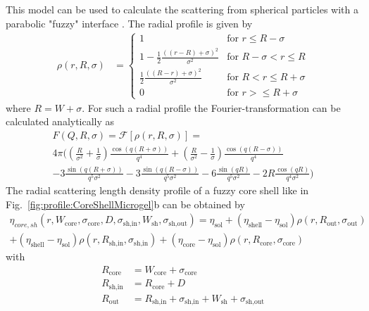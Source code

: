 This model can be used to calculate the scattering from spherical
particles with a parabolic "fuzzy" interface \cite{Berndt2005,Berndt2006,Berndt2006a}.
The radial profile is given by
\begin{align}
\rho(r,R,\sigma) &=
\begin{cases}
1 & \mbox{for } r\leq R-\sigma \\
1-\frac{1}{2}\frac{\left((r-R)+\sigma\right)^2}{\sigma^2} & \mbox{for } R-\sigma < r \leq R \\
\frac{1}{2}\frac{\left((R-r)+\sigma\right)^2}{\sigma^2} & \mbox{for } R< r\leq R+\sigma \\
0 & \mbox{for } r > \leq R+\sigma
\end{cases}
\label{eq:CoreShellMicrogelProfile}
\end{align}
where $R=W+\sigma$. For such a radial profile the Fourier-transformation can be calculated analytically as
\begin{multline}
F(Q,R,\sigma) = \mathcal{F}[\rho(r,R,\sigma)] = \\
4 \pi \Bigg(
        \left(\frac{R}{\sigma^2}+\frac{1}{\sigma}\right) \frac{\cos (q(R+\sigma))}{q^4}
    +   \left(\frac{R}{\sigma^2}-\frac{1}{\sigma}\right) \frac{\cos (q(R-\sigma))}{q^4} \\
    -   3 \frac{\sin(q(R+\sigma))}{q^5 \sigma^2}
    -   3 \frac{\sin(q(R-\sigma))}{q^5 \sigma^2}
    -   6  \frac{\sin(qR)}{q^5 \sigma^2}
    -   2 R \frac{\cos(qR)}{q^4 \sigma^2}
\Bigg)
\end{multline}
The radial scattering length density profile of a fuzzy core
shell like in Fig.\ \ref{fig:profile:CoreShellMicrogel}b can be obtained by
\begin{multline}
\eta_{core,sh}(r,W_\textrm{core},\sigma_\textrm{core},D,\sigma_\textrm{sh,in},W_\textrm{sh},\sigma_\textrm{sh,out}) =
    \eta_\textrm{sol}
+ (\eta_\textrm{shell}-\eta_\textrm{sol}) \rho(r,R_\textrm{out},\sigma_\textrm{out}) \\
+ (\eta_\textrm{shell}-\eta_\textrm{sol}) \rho(r,R_\textrm{sh,in},\sigma_\textrm{sh,in})
+ (\eta_\textrm{core} -\eta_\textrm{sol}) \rho(r,R_\textrm{core},\sigma_\textrm{core})
\end{multline}
with
\begin{subequations}
\begin{align}
    R_\textrm{core} &= W_\textrm{core}+\sigma_\textrm{core} \\
    R_\textrm{sh,in}&= R_\textrm{core}+D \\
    R_\textrm{out}  &= R_\textrm{sh,in}+\sigma_\textrm{sh,in}+W_\textrm{sh}+\sigma_\textrm{sh,out}
\end{align}
\end{subequations}
